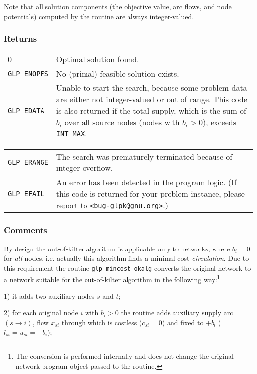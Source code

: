 Note that all solution components (the objective value, arc flows, and
node potentials) computed by the routine are always integer-valued.

\subsubsection*{Returns}

\def\arraystretch{1}

\begin{tabular}{@{}p{25mm}p{97.3mm}@{}}
0 & Optimal solution found.\\
\verb|GLP_ENOPFS| & No (primal) feasible solution exists.\\
\verb|GLP_EDATA| & Unable to start the search, because some problem
data are either not integer-valued or out of range. This code is also
returned if the total supply, which is the sum of $b_i$ over all source
nodes (nodes with $b_i>0$), exceeds \verb|INT_MAX|.\\
\end{tabular}

\noindent
\begin{tabular}{@{}p{25mm}p{97.3mm}@{}}
\verb|GLP_ERANGE| & The search was prematurely terminated because of
integer overflow.\\
\verb|GLP_EFAIL| & An error has been detected in the program logic.
(If this code is returned for your problem instance, please report to
\verb|<bug-glpk@gnu.org>|.)\\
\end{tabular}

\subsubsection*{Comments}

By design the out-of-kilter algorithm is applicable only to networks,
where $b_i=0$ for {\it all} nodes, i.e. actually this algorithm finds a
minimal cost {\it circulation}. Due to this requirement the routine
\verb|glp_mincost_okalg| converts the original network to a network
suitable for the out-of-kilter algorithm in the following
way:\footnote{The conversion is performed internally and does not change
the original network program object passed to the routine.}

1) it adds two auxiliary nodes $s$ and $t$;

2) for each original node $i$ with $b_i>0$ the routine adds auxiliary
supply arc $(s\rightarrow i)$, flow $x_{si}$ through which is costless
($c_{si}=0$) and fixed to $+b_i$ ($l_{si}=u_{si}=+b_i$);

